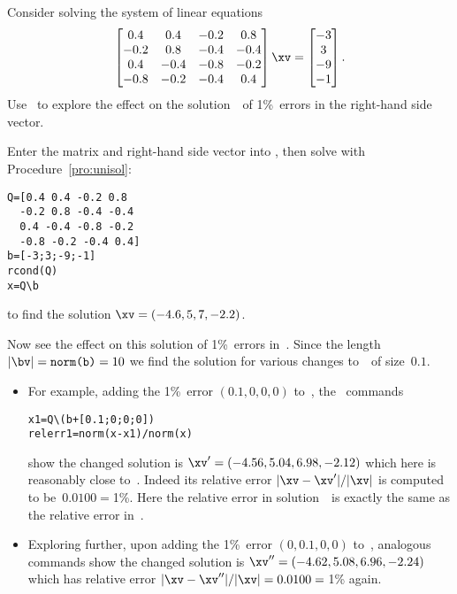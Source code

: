 \begin{example} \label{eg:} 
Consider solving the system of linear equations
\begin{equation*}
\begin{bmatrix} 0.4&0.4&-0.2&0.8
\\-0.2&0.8&-0.4&-0.4
\\0.4&-0.4&-0.8&-0.2
\\-0.8&-0.2&-0.4&0.4 \end{bmatrix}\xv
=\begin{bmatrix} -3\\3\\-9\\-1 \end{bmatrix}.
\end{equation*}
Use \script\ to explore the effect on the solution~\xv\ of 1\%~errors in the right-hand side vector.
\begin{solution} 
Enter the matrix and right-hand side vector into \script, then solve  with Procedure~\ref{pro:unisol}:
\begin{verbatim}
Q=[0.4 0.4 -0.2 0.8
  -0.2 0.8 -0.4 -0.4
  0.4 -0.4 -0.8 -0.2
  -0.8 -0.2 -0.4 0.4]
b=[-3;3;-9;-1]
rcond(Q)
x=Q\b
\end{verbatim}
to find the solution \(\xv=(-4.6,5,7,-2.2)\).
\setbox\ajrqrbox\hbox{}%
\marginpar{\usebox{\ajrqrbox\\[2ex]}}%

Now see the effect on this solution of 1\%~errors in~\bv.
Since the length \(|\bv|=\verb|norm(b)|=10\) we find the solution for various changes to~\bv\ of size~\(0.1\).
\begin{itemize}
\item For example, adding the 1\%~error \((0.1,0,0,0)\) to~\bv, the \script\ commands
\begin{verbatim}
x1=Q\(b+[0.1;0;0;0])
relerr1=norm(x-x1)/norm(x)
\end{verbatim}
show the changed solution is \(\xv'=(-4.56,5.04,6.98,-2.12)\) which here is reasonably close to~\xv.
Indeed its relative error \(|\xv-\xv'|/|\xv|\) is computed to be~\(0.0100={}\)1\%.
Here the relative error in solution~\xv\ is exactly the same as the relative error in~\bv.

\item Exploring further, upon adding the 1\%~error \((0,0.1,0,0)\) to~\bv, analogous commands show the changed solution is \(\xv''=(-4.62,5.08,6.96,-2.24)\) which has relative error \(|\xv-\xv''|/|\xv|=0.0100={}\)1\% again.


\end{itemize}
\end{solution}
\end{example}
